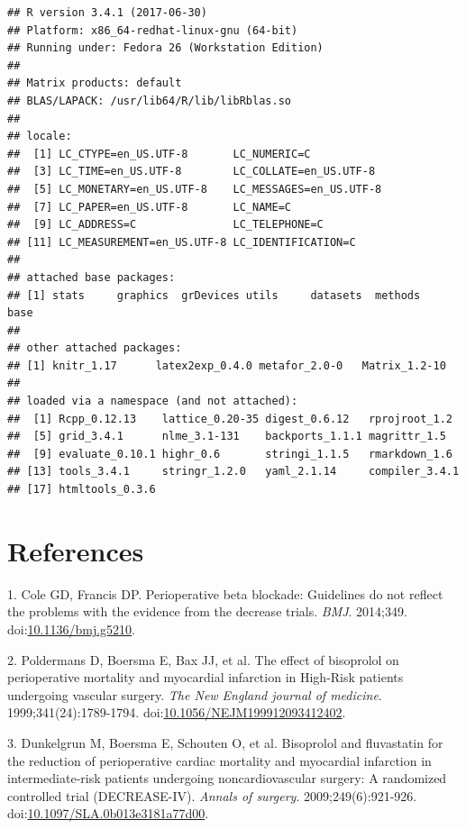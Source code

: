 \documentclass[]{article}
\begin{document}
\begin{verbatim}
## R version 3.4.1 (2017-06-30)
## Platform: x86_64-redhat-linux-gnu (64-bit)
## Running under: Fedora 26 (Workstation Edition)
## 
## Matrix products: default
## BLAS/LAPACK: /usr/lib64/R/lib/libRblas.so
## 
## locale:
##  [1] LC_CTYPE=en_US.UTF-8       LC_NUMERIC=C              
##  [3] LC_TIME=en_US.UTF-8        LC_COLLATE=en_US.UTF-8    
##  [5] LC_MONETARY=en_US.UTF-8    LC_MESSAGES=en_US.UTF-8   
##  [7] LC_PAPER=en_US.UTF-8       LC_NAME=C                 
##  [9] LC_ADDRESS=C               LC_TELEPHONE=C            
## [11] LC_MEASUREMENT=en_US.UTF-8 LC_IDENTIFICATION=C       
## 
## attached base packages:
## [1] stats     graphics  grDevices utils     datasets  methods   base     
## 
## other attached packages:
## [1] knitr_1.17      latex2exp_0.4.0 metafor_2.0-0   Matrix_1.2-10  
## 
## loaded via a namespace (and not attached):
##  [1] Rcpp_0.12.13    lattice_0.20-35 digest_0.6.12   rprojroot_1.2  
##  [5] grid_3.4.1      nlme_3.1-131    backports_1.1.1 magrittr_1.5   
##  [9] evaluate_0.10.1 highr_0.6       stringi_1.1.5   rmarkdown_1.6  
## [13] tools_3.4.1     stringr_1.2.0   yaml_2.1.14     compiler_3.4.1 
## [17] htmltools_0.3.6
\end{verbatim}

\section*{References}\label{references}

\hypertarget{refs}{}
\hypertarget{ref-Coleg5210}{}
1. Cole GD, Francis DP. Perioperative beta blockade: Guidelines do not
reflect the problems with the evidence from the decrease trials.
\emph{BMJ}. 2014;349.
doi:\href{https://doi.org/10.1136/bmj.g5210}{10.1136/bmj.g5210}.

\hypertarget{ref-poldermans1999}{}
2. Poldermans D, Boersma E, Bax JJ, et al. The effect of bisoprolol on
perioperative mortality and myocardial infarction in High-Risk patients
undergoing vascular surgery. \emph{The New England journal of medicine}.
1999;341(24):1789-1794.
doi:\href{https://doi.org/10.1056/NEJM199912093412402}{10.1056/NEJM199912093412402}.

\hypertarget{ref-dunkelgrun2009}{}
3. Dunkelgrun M, Boersma E, Schouten O, et al. Bisoprolol and
fluvastatin for the reduction of perioperative cardiac mortality and
myocardial infarction in intermediate-risk patients undergoing
noncardiovascular surgery: A randomized controlled trial (DECREASE-IV).
\emph{Annals of surgery}. 2009;249(6):921-926.
doi:\href{https://doi.org/10.1097/SLA.0b013e3181a77d00}{10.1097/SLA.0b013e3181a77d00}.
\end{document}
